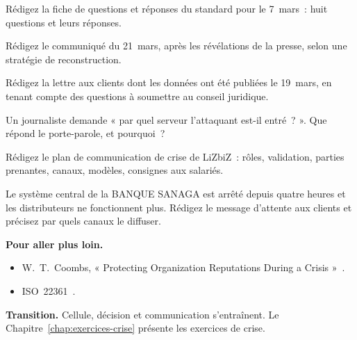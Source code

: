 \begin{boxexo}[title={\ding{45}\quad Exercice~24.5. Questions et réponses \niveaumoyen}]
Rédigez la fiche de questions et réponses du standard pour le 7~mars~:
huit questions et leurs réponses.
\end{boxexo}

\begin{boxexo}[title={\ding{45}\quad Exercice~24.6. Le 21 mars \niveaumoyen}]
Rédigez le communiqué du 21~mars, après les révélations de la presse, selon
une stratégie de reconstruction.
\end{boxexo}

\begin{boxexo}[title={\ding{45}\quad Exercice~24.7. La lettre \niveaumoyen}]
Rédigez la lettre aux clients dont les données ont été publiées le
19~mars, en tenant compte des questions à soumettre au conseil juridique.
\end{boxexo}

\begin{boxexo}[title={\ding{45}\quad Exercice~24.8. Ce qu'on ne dit pas \niveaumoyen}]
Un journaliste demande « par quel serveur l'attaquant est-il entré~? ».
Que répond le porte-parole, et pourquoi~?
\end{boxexo}

\begin{boxexo}[title={\ding{45}\quad Exercice~24.9. Un plan de communication \niveauexpert}]
Rédigez le plan de communication de crise de LiZbiZ~: rôles, validation,
parties prenantes, canaux, modèles, consignes aux salariés.
\end{boxexo}

\begin{boxexo}[title={\ding{45}\quad Exercice~24.10. Une banque \niveauexpert}]
Le système central de la BANQUE SANAGA est arrêté depuis quatre heures et
les distributeurs ne fonctionnent plus. Rédigez le message d'attente aux
clients et précisez par quels canaux le diffuser.
\end{boxexo}

\bigskip

\begin{boxinfo}
\textbf{Pour aller plus loin.}
\begin{itemize}
    \item W.~T.~Coombs, « Protecting Organization Reputations During a
          Crisis »~\cite{coombs2007}.
    \item ISO~22361~\cite{iso22361_2022}.
\end{itemize}
\end{boxinfo}

\begin{boxinfo}
\textbf{Transition.} Cellule, décision et communication s'entraînent. Le
Chapitre~\ref{chap:exercices-crise} présente les exercices de crise.
\end{boxinfo}

